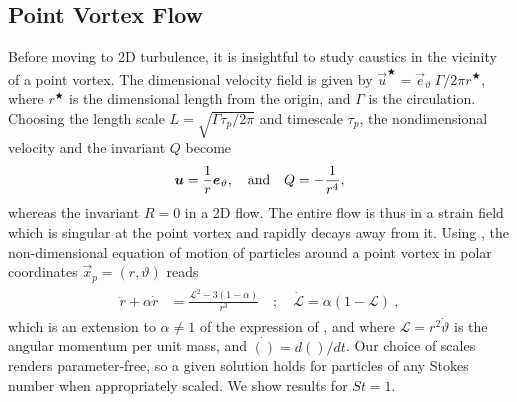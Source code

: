 \documentclass[../Rajarshi-thesis-draft.tex]{subfiles}
\begin{document}
\subsection{Point Vortex Flow}\label{int-pv}
Before moving to 2D turbulence, it is insightful to study caustics in the vicinity of a point vortex.
The dimensional velocity field is given by $\vec{u}^\bigstar = \vec{e}_\vartheta ~\Gamma /2\pi r^\bigstar$, where $r^\bigstar$ is the dimensional length from the origin, and $\Gamma$ is the circulation. Choosing the length scale $L  = \sqrt{\Gamma \tau_p/2\pi}$ \cite{ravichandran2015}  and timescale $\tau_p$, the nondimensional velocity and the invariant $Q$ become
\begin{equation}
    \vec{u} = \frac{1}{r}\vec{e}_\vartheta, \quad {\rm and} \quad Q = -\frac{1}{r^4},
\end{equation}
whereas the invariant $R=0$ in a 2D flow. The entire flow is thus in a strain field which is singular at the point vortex and rapidly decays away from it.
Using , the non-dimensional equation of motion of particles around a point vortex in polar coordinates $\vec{x}_p = (r,\vartheta)$ reads
\begin{align}
  \label{int-nd_ptvrtx}
  \begin{split}
      \ddot{r} + \alpha \dot{r} &= \frac{\mathscr{L}^2 - 3(1-\alpha)}{r^3} \quad
 ; \quad \dot{\mathscr{L}} = \alpha(1 - \mathscr{L}) \ ,
  \end{split}
\end{align}
 which is an extension to $\alpha \ne 1$ of the expression of \cite{ravichandran2015}, and where $\mathscr{L} = r^2 \dot{\vartheta}$ is the angular momentum per unit mass, and $\dot{()} = d()/dt$. Our choice of scales renders  parameter-free, so a given solution holds for particles of any Stokes number when appropriately scaled. We show results for $St=1$.
\end{document}
